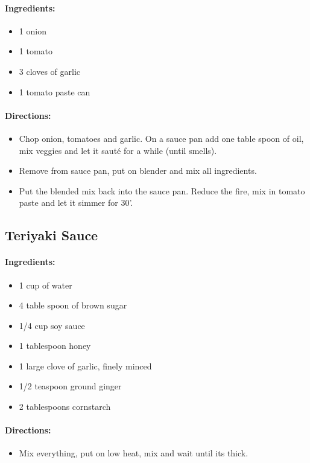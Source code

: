 \documentclass{article}
\begin{document}
\paragraph{Ingredients:}

\begin{itemize}
	\item 1 onion 
	\item 1 tomato 
	\item 3 cloves of garlic 
	\item 1 tomato paste can
\end{itemize}

\paragraph{Directions:}
\begin{itemize}
	\item Chop onion, tomatoes and garlic. On a sauce pan add one table spoon of oil, mix veggies and let it sauté for a while (until smells). 
	\item Remove from sauce pan, put on blender and mix all ingredients. 
	\item Put the blended mix back into the sauce pan. Reduce the fire, mix in tomato paste and let it simmer for 30'.
\end{itemize}

\subsection{Teriyaki Sauce}

\paragraph{Ingredients:}

\begin{itemize}
	\item 1 cup of water
	\item 4 table spoon of brown sugar
	\item 1/4 cup soy sauce
	\item 1 tablespoon honey
	\item 1 large clove of garlic, finely minced
	\item 1/2 teaspoon ground ginger
	\item 2 tablespoons cornstarch
\end{itemize}

\paragraph{Directions:}
\begin{itemize}
	\item Mix everything, put on low heat, mix and wait until its thick.
\end{itemize}
\end{document}
